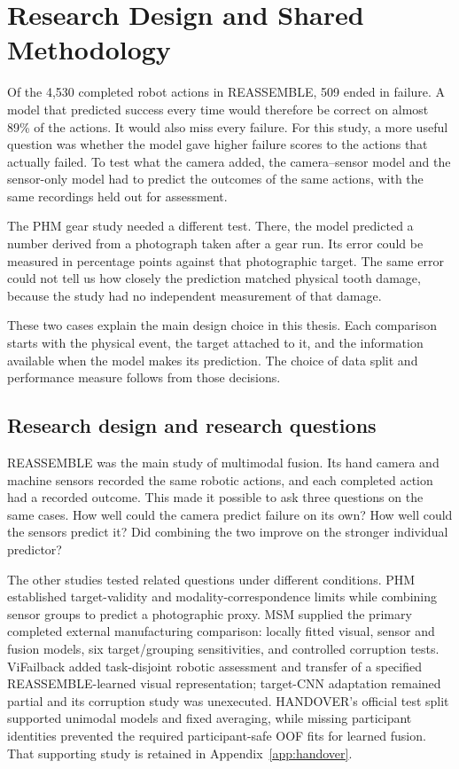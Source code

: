 \chapter{Research Design and Shared Methodology}
\label{ch:methodology}

Of the 4,530 completed robot actions in REASSEMBLE, 509 ended in failure. A model that
predicted success every time would therefore be correct on almost 89\% of the actions.
It would also miss every failure. For this study, a more useful question was whether the
model gave higher failure scores to the actions that actually failed. To test what the
camera added, the camera–sensor model and the sensor-only model had to predict the
outcomes of the same actions, with the same recordings held out for assessment.

The PHM gear study needed a different test. There, the model predicted a number derived
from a photograph taken after a gear run. Its error could be measured in percentage
points against that photographic target. The same error could not tell us how closely
the prediction matched physical tooth damage, because the study had no independent
measurement of that damage.

These two cases explain the main design choice in this thesis. Each comparison starts
with the physical event, the target attached to it, and the information available when
the model makes its prediction. The choice of data split and performance measure follows
from those decisions.

\section{Research design and research questions}
\label{sec:ch4-design}

REASSEMBLE was the main study of multimodal fusion. Its hand camera and machine sensors
recorded the same robotic actions, and each completed action had a recorded outcome.
This made it possible to ask three questions on the same cases. How well could the
camera predict failure on its own? How well could the sensors predict it? Did combining
the two improve on the stronger individual predictor?

The other studies tested related questions under different conditions. PHM established
target-validity and modality-correspondence limits while combining sensor groups to
predict a photographic proxy. MSM supplied the primary completed external manufacturing
comparison: locally fitted visual, sensor and fusion models, six target/grouping
sensitivities, and controlled corruption tests. ViFailback added task-disjoint robotic
assessment and transfer of a specified REASSEMBLE-learned visual representation; target-CNN
adaptation remained partial and its corruption study was unexecuted. HANDOVER's official
test split supported unimodal models and fixed averaging, while missing participant
identities prevented the required participant-safe OOF fits for learned fusion. That
supporting study is retained in Appendix~\ref{app:handover}.

